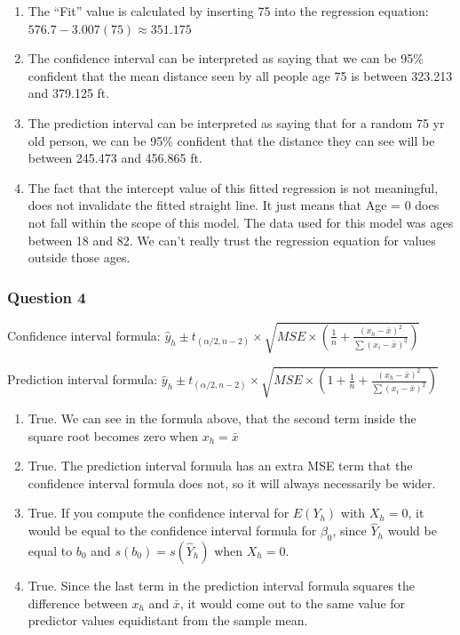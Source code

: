 \documentclass{article}
\begin{document}
\begin{enumerate}
\def\labelenumi{\alph{enumi}.}
\setcounter{enumi}{3}
\item
  The ``Fit'' value is calculated by inserting 75 into the regression
  equation: \(576.7 - 3.007(75) \approx 351.175\)
\item
  The confidence interval can be interpreted as saying that we can be
  95\% confident that the mean distance seen by all people age 75 is
  between 323.213 and 379.125 ft.
\item
  The prediction interval can be interpreted as saying that for a random
  75 yr old person, we can be 95\% confident that the distance they can
  see will be between 245.473 and 456.865 ft.
\item
  The fact that the intercept value of this fitted regression is not
  meaningful, does not invalidate the fitted straight line. It just
  means that Age = 0 does not fall within the scope of this model. The
  data used for this model was ages between 18 and 82. We can't really
  trust the regression equation for values outside those ages.
\end{enumerate}

    \subsubsection{Question 4}\label{question-4}

Confidence interval formula:
\(\hat{y}_h \pm t_{(\alpha/2,n-2)} \times \sqrt{MSE \times \left(\frac{1}{n} + \frac{(x_h - \bar{x})^2}{\sum (x_i - \bar{x})^2}\right)}\)

Prediction interval formula:
\(\hat{y}_h \pm t_{(\alpha/2,n-2)} \times \sqrt{MSE \times \left(1 + \frac{1}{n} + \frac{(x_h - \bar{x})^2}{\sum (x_i - \bar{x})^2}\right)}\)

\begin{enumerate}
\def\labelenumi{\alph{enumi}.}
\item
  True. We can see in the formula above, that the second term inside the
  square root becomes zero when \(x_h = \bar{x}\)
\item
  True. The prediction interval formula has an extra MSE term that the
  confidence interval formula does not, so it will always necessarily be
  wider.
\item
  True. If you compute the confidence interval for \(E(Y_h)\) with
  \(X_h = 0\), it would be equal to the confidence interval formula for
  \(\beta_0\), since \(\hat{Y}_h\) would be equal to \(b_0\) and
  \(s(b_0) = s(\hat{Y}_h)\) when \(X_h = 0\).
\item
  True. Since the last term in the prediction interval formula squares
  the difference between \(x_h\) and \(\bar{x}\), it would come out to
  the same value for predictor values equidistant from the sample mean.
\end{enumerate}
\end{document}
